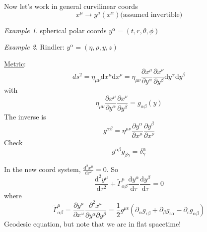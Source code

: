 \documentclass[a4paper]{book}
\theoremstyle{definition}
\theoremstyle{remark}
\newtheorem*{example}{Example}
\begin{document}
Now let's work in general curvilinear coords 
\begin{equation}
    x^\mu \rightarrow y^\mu(x^\alpha) \text{(assumed invertible)}
\end{equation}
\begin{example}
    spherical polar coords $y^\alpha = (t, r, \theta, \phi)$
\end{example}
\begin{example}
    Rindler: $y^\alpha = (\eta, \rho, y, z)$
\end{example}
\underline{Metric}: 
\begin{equation}
    ds^2 = \eta_{\mu\nu} \text{d}x^\mu \text{d}x^\nu = \eta _{\mu\nu} \frac{\partial x^\mu}{\partial y ^\alpha} \frac{\partial x^\nu}{\partial y ^\beta} \text{d} y^\alpha \text{d}y ^\beta
\end{equation}
with 
\begin{equation}
    \eta _{\mu\nu} \frac{\partial x^\mu}{\partial y ^\alpha} \frac{\partial x^\nu}{\partial y ^\beta}  = g_{\alpha\beta}(y)
\end{equation}
The inverse is 
\begin{equation}
    g^{\alpha\beta} = \eta ^{\mu\nu} \frac{\partial y ^\alpha}{\partial x^\mu} \frac{\partial y ^\beta}{\partial x^\nu} 
\end{equation}
Check 
\begin{equation}
    g^{\alpha\beta}g_{\beta\gamma} = \delta^\alpha_\gamma
\end{equation}

In the new coord system, $\frac{\text{d}^2x^\mu}{\text{d}\tau^2} = 0$. So 
\begin{equation}
    \frac{\text{d}^2y^\mu}{\text{d} \tau^2} + \tilde{\Gamma}^\mu_{\alpha\beta}\frac{\text{d}y^\alpha}{\text{d}\tau}\frac{\text{d}y^\beta}{\text{d}\tau} = 0
\end{equation}
where 
\begin{equation}
    \tilde{\Gamma}^\mu_{\alpha\beta} = \frac{\partial y^\mu}{\partial x^\omega} \frac{\partial^2 x^\omega}{\partial y^\alpha\partial y^\beta } = \frac{1}{2}g^{\mu\epsilon}(\partial_\alpha g_{\epsilon\beta} + \partial_\beta g_{\epsilon\alpha} - \partial_\epsilon g_{\alpha\beta})
\end{equation}
Geodesic equation, but note that we are in flat spacetime!\par \medskip 
\end{document}
